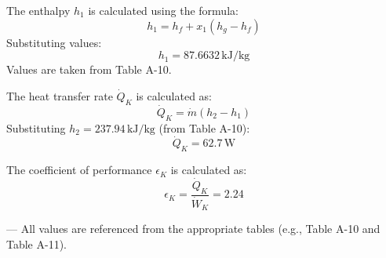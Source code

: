 The enthalpy \( h_1 \) is calculated using the formula:  
\[
h_1 = h_f + x_1 (h_g - h_f)
\]  
Substituting values:  
\[
h_1 = 87.6632 \, \text{kJ/kg}
\]  
Values are taken from Table A-10.  

The heat transfer rate \( \dot{Q}_K \) is calculated as:  
\[
\dot{Q}_K = \dot{m} (h_2 - h_1)
\]  
Substituting \( h_2 = 237.94 \, \text{kJ/kg} \) (from Table A-10):  
\[
\dot{Q}_K = 62.7 \, \text{W}
\]  

The coefficient of performance \( \epsilon_K \) is calculated as:  
\[
\epsilon_K = \frac{\dot{Q}_K}{\dot{W}_K} = 2.24
\]  

---  
All values are referenced from the appropriate tables (e.g., Table A-10 and Table A-11).